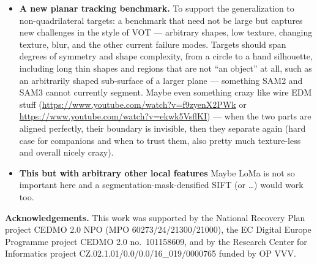 \documentclass[10pt,twocolumn,letterpaper]{article}
\begin{document}
\begin{itemize}
\item \textbf{A new planar tracking benchmark.}
To support the generalization to non-quadrilateral targets: a benchmark that need not be large but captures new challenges in the style of VOT --- arbitrary shapes, low texture, changing texture, blur, and the other current failure modes.
Targets should span degrees of symmetry and shape complexity, from a circle to a hand silhouette, including long thin shapes and regions that are not ``an object'' at all, such as an arbitrarily shaped sub-surface of a larger plane --- something SAM2 and SAM3 cannot currently segment.
Maybe even something crazy like wire EDM stuff (\url{https://www.youtube.com/watch?v=f9zyenX2PWk} or \url{https://www.youtube.com/watch?v=ekwk5VsflKI}) --- when the two parts are aligned perfectly, their boundary is invisible, then they separate again (hard case for companions and when to trust them, also pretty much texture-less and overall nicely crazy).

\item \textbf{This but with arbitrary other local features}
  Maybe LoMa is not so important here and a segmentation-mask-densified SIFT (or \dots) would work too.
\end{itemize}

\vspace{5mm}
\noindent\textbf{Acknowledgements.}
This work was supported by the National Recovery Plan project CEDMO 2.0 NPO (MPO 60273/24/21300/21000), the EC Digital Europe Programme project CEDMO 2.0 no.\ 101158609, and by the Research Center for Informatics project CZ.02.1.01/0.0/0.0/16\_019/0000765 funded by OP VVV.

{
    \small
    
    
}

\ifcombined\fi
\end{document}
